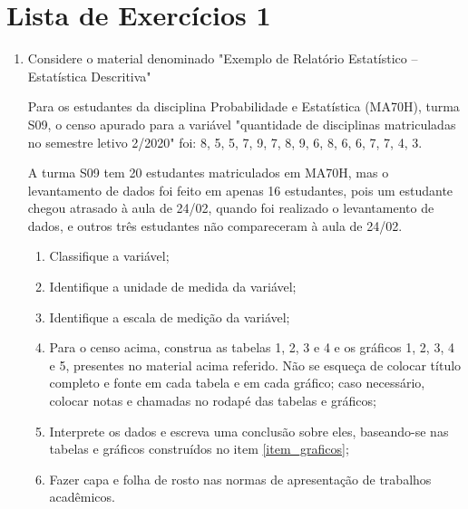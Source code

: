 \chapter{Lista de Exercícios 1}


\begin{enumerate}[label=\emph{\arabic*})]

	\item Considere o material denominado "Exemplo de Relatório Estatístico – Estatística Descritiva"

	  	  Para os estudantes da disciplina Probabilidade e Estatística (MA70H), turma S09, o censo apurado para a variável "quantidade de disciplinas matriculadas no semestre letivo 2/2020" foi: 8, 5, 5, 7, 9, 7, 8, 9, 6, 8, 6, 6, 7, 7, 4, 3.

	      A turma S09 tem 20 estudantes matriculados em MA70H, mas o levantamento de dados foi feito em apenas 16 estudantes, pois um estudante chegou atrasado à aula de 24/02, quando foi realizado o levantamento de dados, e outros três estudantes não compareceram à aula de 24/02.

	      \begin{enumerate}[label=\emph{\alph*})]

		      \item Classifique a variável;

		      \item Identifique a unidade de medida da variável;
															      														  \item Identifique a escala de medição da variável;
			  
			  \item \label{item_graficos} Para o censo acima, construa as tabelas 1, 2, 3 e 4 e os gráficos 1, 2, 3, 4 e 5, presentes no material acima referido. Não se esqueça de colocar título completo e fonte em cada tabela e em cada gráfico; caso necessário, colocar notas e chamadas no rodapé das tabelas e gráficos;			  
			  
			  \item Interprete os dados e escreva uma conclusão sobre eles, baseando-se nas tabelas e gráficos construídos no item \ref{item_graficos};
			  
			  \item Fazer capa e folha de rosto nas normas de apresentação de trabalhos acadêmicos. 				  

	      \end{enumerate}	

\end{enumerate}



